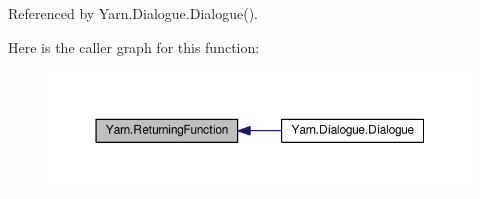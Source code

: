 Referenced by Yarn.\-Dialogue.\-Dialogue().



Here is the caller graph for this function\-:
\nopagebreak
\begin{figure}[H]
\begin{center}
\leavevmode
\includegraphics[width=350pt]{a00048_a5177bf74fbfe7303fac9d8236c2e514b_icgraph}
\end{center}
\end{figure}


